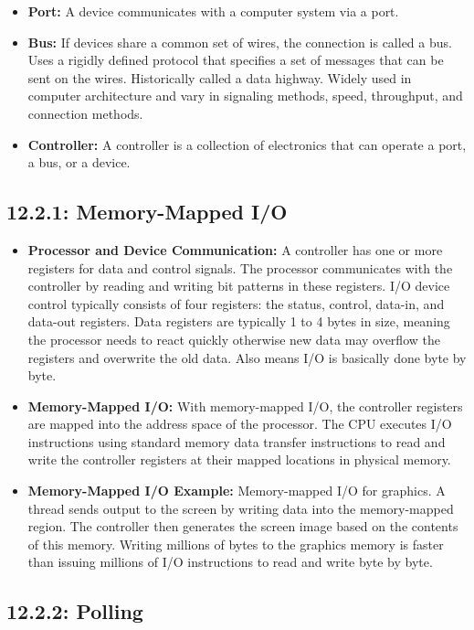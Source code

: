 \documentclass[12pt]{article}
\begin{document}
\begin{itemize}
    \item \textbf{Port:} A device communicates with a computer system via a port.
    \item \textbf{Bus:} If devices share a common set of wires, the connection is called a bus. Uses a rigidly defined protocol that specifies a set of messages that can be sent on the wires. Historically called a data highway. Widely used in computer architecture and vary in signaling methods, speed, throughput, and connection methods.
    \item \textbf{Controller:}  A controller is a collection of electronics that can operate a port, a bus, or a device.
\end{itemize}

\subsection*{12.2.1: Memory-Mapped I/O}

\begin{itemize}
    \item \textbf{Processor and Device Communication:} A controller has one or more registers for data and control signals. The processor communicates with the controller by reading and writing bit patterns in these registers. I/O device control typically consists of four registers: the status, control, data-in, and data-out registers. Data registers are typically 1 to 4 bytes in size, meaning the processor needs to react quickly otherwise new data may overflow the registers and overwrite the old data. Also means I/O is basically done byte by byte.
    \item \textbf{Memory-Mapped I/O:} With memory-mapped I/O, the controller registers are mapped into the address space of the processor. The CPU executes I/O instructions using standard memory data transfer instructions to read and write the controller registers at their mapped locations in physical memory.
    \item \textbf{Memory-Mapped I/O Example:} Memory-mapped I/O for graphics. A thread sends output to the screen by writing data into the memory-mapped region. The controller then generates the screen image based on the contents of this memory. Writing millions of bytes to the graphics memory is faster than issuing millions of I/O instructions to read and write byte by byte.
\end{itemize}

\subsection*{12.2.2: Polling}
\end{document}
